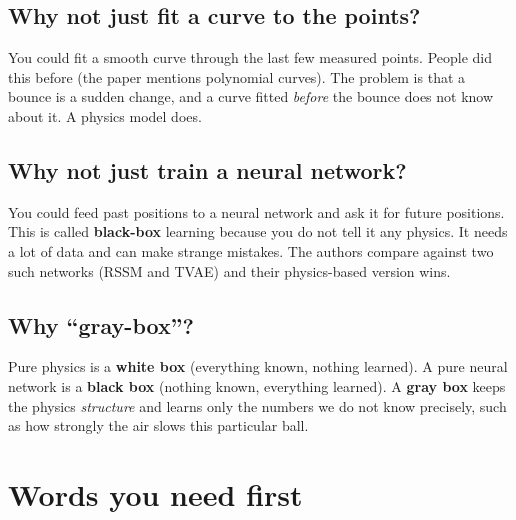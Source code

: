 \documentclass[11pt,a4paper]{article}
\begin{document}
\subsection*{Why not just fit a curve to the points?}
You could fit a smooth curve through the last few measured points. People did this before
(the paper mentions polynomial curves). The problem is that a bounce is a sudden change, and
a curve fitted \emph{before} the bounce does not know about it. A physics model does.

\subsection*{Why not just train a neural network?}
You could feed past positions to a neural network and ask it for future positions. This is
called \textbf{black-box} learning because you do not tell it any physics. It needs a lot of
data and can make strange mistakes. The authors compare against two such networks (RSSM and
TVAE) and their physics-based version wins.

\subsection*{Why ``gray-box''?}
Pure physics is a \textbf{white box} (everything known, nothing learned). A pure neural network is a
\textbf{black box} (nothing known, everything learned). A \textbf{gray box} keeps the physics
\emph{structure} and learns only the numbers we do not know precisely, such as how strongly
the air slows this particular ball.

\section{Words you need first}
\end{document}
